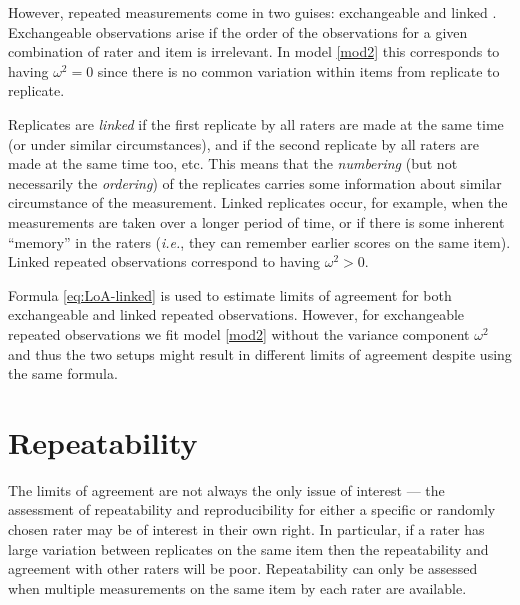 \documentclass[aoas]{imsart}
\makeatletter
\newcommand{\ie}{\emph{i.e.}\@\xspace}
\makeatother
\begin{document}
However, repeated measurements come in two guises: exchangeable and
linked \citep{BlanAltm:2007,Carstensen.2008b}. 
Exchangeable observations arise if the order of the
observations for a given combination of rater and item is
irrelevant. In model \eqref{mod2} this corresponds to having
$\omega^2=0$ since there is no common variation within items from replicate to replicate.


Replicates are \emph{linked} if the first replicate by all raters are
made at the same time (or under similar circumstances), and if the
second replicate by all raters are made at the same time too,
etc. This means that the \emph{numbering} (but not necessarily the
\emph{ordering}) of the replicates carries some information about
similar circumstance of the measurement. Linked replicates occur,
for example, when the measurements are taken over a longer period of
time, or if there is some inherent ``memory'' in the raters (\ie, they
can remember earlier scores on the same item). Linked repeated
observations correspond to having $\omega^2>0$.

Formula \eqref{eq:LoA-linked} is used to estimate limits of agreement
for both exchangeable and linked repeated observations. However, for
exchangeable repeated observations we fit model \eqref{mod2} without
the variance component $\omega^2$ and thus the two setups might result
in different limits of agreement despite using the same formula.






\section{Repeatability}
\label{sec:repeatability}

The limits of agreement are not always the only issue of interest ---
the assessment of repeatability and reproducibility for either a specific or
randomly chosen rater
may be of interest in their own right. In particular, if a rater has
large variation between replicates on the same item then the
repeatability and agreement with other raters will be poor.
Repeatability can only be assessed when multiple measurements on the
same item by each
rater are available.
\end{document}
